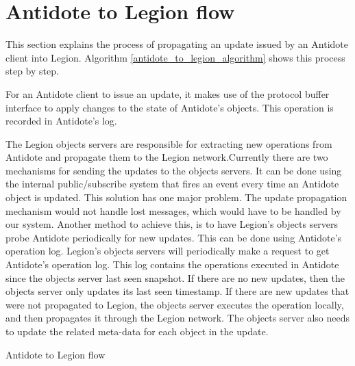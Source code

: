 \section{Antidote to Legion flow}
\label{sec:antidote_to_legion_flow}
This section explains the process of propagating an update issued by an Antidote client into Legion. Algorithm \ref{antidote_to_legion_algorithm} shows this process step by step.\par
	For an Antidote client to issue an update, it makes use of the protocol buffer interface\cite{protocol_buffers} to apply changes to the state of Antidote's objects. This operation is recorded in Antidote's log.\par
	The Legion objects servers are responsible for extracting new operations from Antidote and propagate them to the Legion network.Currently there are two mechanisms for sending the updates to the objects servers. It can be done using the internal public/subscribe system that fires an event every time an Antidote object is updated. This solution has one major problem. The update propagation mechanism would not handle lost messages, which would have to be handled by our system.
	Another method to achieve this, is to have Legion's objects servers probe Antidote periodically for new updates. This can be done using Antidote's operation log. Legion's objects servers will periodically make a request to get Antidote's operation log. This log contains the operations executed in Antidote since the objects server last seen snapshot. If there are no new updates, then the objects server only updates its last seen timestamp. If there are new updates that were not propagated to Legion, the objects server executes the operation locally, and then propagates it through the Legion network. The objects server also needs to update the related meta-data for each object in the update.
	
\begin{algorithm}
\caption{Antidote to Legion flow}
\label{antidote_to_legion_algorithm}
\begin{algorithmic}[1]
          \Else {}
          \EndIf
      \EndIf
    \EndFor
  \End
\end{algorithmic}
\end{algorithm}